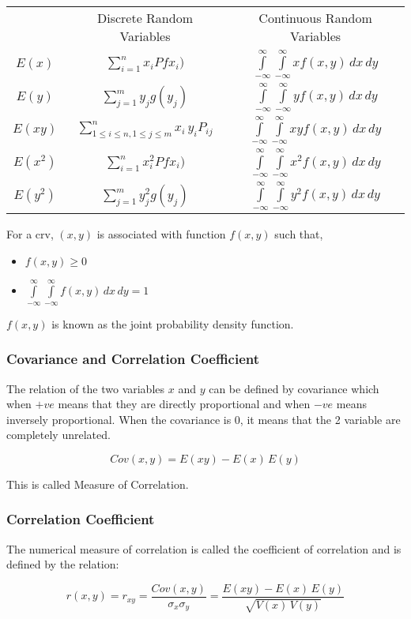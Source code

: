 \documentclass[./EngineeringMaths.tex]{subfiles}
\begin{document}
\begin{center}
{\renewcommand{\arraystretch}{2}
\begin{tabular}{c|c|c|}
\cline{2-3}
& Discrete Random Variables & Continuous Random Variables \\
\cline{2-3}
\multicolumn{1}{c|}{$E(x)$} & $\sum\limits_{i=1}^n x_i Pfx_i)$ &  $\int\limits_{-\infty}^\infty\int\limits_{-\infty}^\infty x f(x,y) \, dx\,dy $ \\
\cline{2-3}
\multicolumn{1}{c|}{$E(y)$} & $\sum\limits_{j=1}^m y_j g(y_j)$ &  $\int\limits_{-\infty}^\infty\int\limits_{-\infty}^\infty y f(x,y) \, dx\,dy $ \\
\cline{2-3}
\multicolumn{1}{c|}{$E(xy)$} & $\sum\limits_{1\leq i\leq n,1\leq j\leq m}^n x_i\,y_i P_{ij}$ &  $\int\limits_{-\infty}^\infty\int\limits_{-\infty}^\infty xy f(x,y) \, dx\,dy $ \\
\cline{2-3}
\multicolumn{1}{c|}{$E(x^2)$} & $\sum\limits_{i=1}^n x_i^2 Pfx_i)$ &  $\int\limits_{-\infty}^\infty\int\limits_{-\infty}^\infty x^2 f(x,y) \, dx\,dy $ \\
\cline{2-3}
\multicolumn{1}{c|}{$E(y^2)$} & $\sum\limits_{j=1}^m y_j^2 g(y_j)$ &  $\int\limits_{-\infty}^\infty\int\limits_{-\infty}^\infty y^2 f(x,y) \, dx\,dy $ \\
\cline{2-3}
\end{tabular}}
\end{center}

For a crv, $(x,y)$ is associated with function $f(x,y)$ such that,
\begin{itemize}
\item $f(x,y) \geq 0$
\item $\int\limits_{-\infty}^\infty\int\limits_{-\infty}^\infty f(x,y) \,dx\,dy = 1$
\end{itemize}
$f(x,y)$ is known as the joint probability density function.

\subsubsection{Covariance and Correlation Coefficient}
The relation of the two variables $x$ and $y$ can be defined by covariance which when $+ve$ means that they are directly proportional and when $-ve$ means inversely proportional. When the covariance is 0, it means that the 2 variable are completely unrelated.

$$Cov(x,y) = E(xy) - E(x)\,E(y)$$

This is called Measure of Correlation.

\subsubsection*{Correlation Coefficient}
The numerical measure of correlation is called the coefficient of correlation and is defined by the relation: 

$$ r(x,y) = r_{xy} = \frac{Cov(x,y)}{\sigma_x\sigma_y} = \frac{E(xy) - E(x)\,E(y)}{\sqrt{V(x)\,V(y)}} $$
\end{document}
